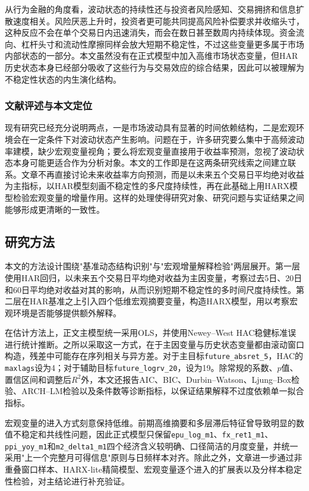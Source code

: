 从行为金融的角度看，波动状态的持续性还与投资者风险感知、交易拥挤和信息扩散速度相关。风险厌恶上升时，投资者更可能共同提高风险补偿要求并收缩头寸，这种反应不会在单个交易日内迅速消失，而会在数日甚至数周内持续体现\cite{wang2004,yin2019}。资金流向、杠杆头寸和流动性摩擦同样会放大短期不稳定性\cite{yang2023}，不过这些变量更多属于市场内部状态的一部分。本文虽然没有在正式模型中加入高维市场状态变量，但HAR历史状态本身已经部分吸收了这些行为与交易效应的综合结果，因此可以被理解为不稳定性状态的内生演化结构。

\subsubsection{文献评述与本文定位}

现有研究已经充分说明两点，一是市场波动具有显著的时间依赖结构，二是宏观环境会在一定条件下对波动状态产生影响。问题在于，许多研究要么集中于高频波动率建模，缺少宏观变量视角；要么将宏观变量直接用于收益率预测，忽视了波动状态本身可能更适合作为分析对象。本文的工作即是在这两条研究线索之间建立联系。文章不再直接讨论未来收益率方向预测，而是以未来五个交易日平均绝对收益为主指标，以HAR模型刻画不稳定性的多尺度持续性，再在此基础上用HARX模型检验宏观变量的增量作用。这样的处理使得研究对象、研究问题与实证结果之间能够形成更清晰的一致性。

\subsection{研究方法}

本文的方法设计围绕"基准动态结构识别"与"宏观增量解释检验"两层展开。第一层使用HAR回归，以未来五个交易日平均绝对收益为主因变量，考察过去5日、20日和60日平均绝对收益对其的影响，从而识别短期不稳定性的多时间尺度持续性。第二层在HAR基准之上引入四个低维宏观摘要变量，构造HARX模型，用以考察宏观环境是否能够提供额外解释。

在估计方法上，正文主模型统一采用OLS，并使用Newey--West HAC稳健标准误进行统计推断。之所以采取这一方式，在于主因变量与历史状态变量都由滚动窗口构造，残差中可能存在序列相关与异方差。对于主目标\texttt{future\_absret\_5}，HAC的\texttt{maxlags}设为4；对于辅助目标\texttt{future\_logrv\_20}，设为19。除常规的系数、\(p\)值、置信区间和调整后\(R^2\)外，本文还报告AIC、BIC、Durbin--Watson、Ljung--Box检验、ARCH--LM检验以及条件数等诊断指标，以保证结果解释不过度依赖单一拟合指标。

宏观变量的进入方式刻意保持低维。前期高维摘要和多层滞后特征曾导致明显的数值不稳定和共线性问题，因此正式模型只保留\texttt{epu\_log\_m1}、\texttt{fx\_ret1\_m1}、\texttt{ppi\_yoy\_m1}和\texttt{m2\_delta1\_m1}四个经济含义较明确、口径简洁的月度变量，并统一采用"上一个完整月可得信息"原则与日频样本对齐。除此之外，文章进一步通过非重叠窗口样本、HARX-lite精简模型、宏观变量逐个进入的扩展表以及分样本稳定性检验，对主结论进行补充验证。

